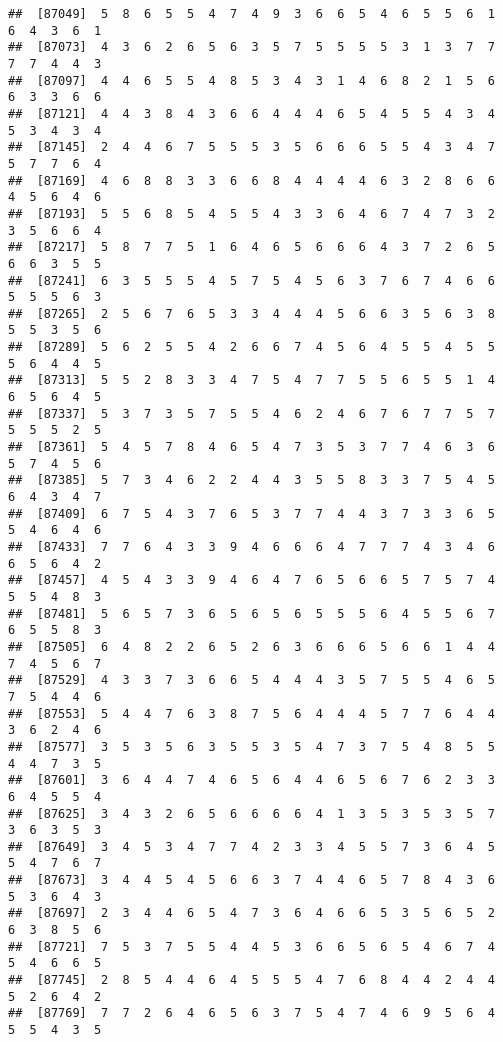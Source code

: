 \documentclass[
]{book}
\begin{document}
\begin{verbatim}
##  [87049]  5  8  6  5  5  4  7  4  9  3  6  6  5  4  6  5  5  6  1  6  4  3  6  1
##  [87073]  4  3  6  2  6  5  6  3  5  7  5  5  5  5  3  1  3  7  7  7  7  4  4  3
##  [87097]  4  4  6  5  5  4  8  5  3  4  3  1  4  6  8  2  1  5  6  6  3  3  6  6
##  [87121]  4  4  3  8  4  3  6  6  4  4  4  6  5  4  5  5  4  3  4  5  3  4  3  4
##  [87145]  2  4  4  6  7  5  5  5  3  5  6  6  6  5  5  4  3  4  7  5  7  7  6  4
##  [87169]  4  6  8  8  3  3  6  6  8  4  4  4  4  6  3  2  8  6  6  4  5  6  4  6
##  [87193]  5  5  6  8  5  4  5  5  4  3  3  6  4  6  7  4  7  3  2  3  5  6  6  4
##  [87217]  5  8  7  7  5  1  6  4  6  5  6  6  6  4  3  7  2  6  5  6  6  3  5  5
##  [87241]  6  3  5  5  5  4  5  7  5  4  5  6  3  7  6  7  4  6  6  5  5  5  6  3
##  [87265]  2  5  6  7  6  5  3  3  4  4  4  5  6  6  3  5  6  3  8  5  5  3  5  6
##  [87289]  5  6  2  5  5  4  2  6  6  7  4  5  6  4  5  5  4  5  5  5  6  4  4  5
##  [87313]  5  5  2  8  3  3  4  7  5  4  7  7  5  5  6  5  5  1  4  6  5  6  4  5
##  [87337]  5  3  7  3  5  7  5  5  4  6  2  4  6  7  6  7  7  5  7  5  5  5  2  5
##  [87361]  5  4  5  7  8  4  6  5  4  7  3  5  3  7  7  4  6  3  6  5  7  4  5  6
##  [87385]  5  7  3  4  6  2  2  4  4  3  5  5  8  3  3  7  5  4  5  6  4  3  4  7
##  [87409]  6  7  5  4  3  7  6  5  3  7  7  4  4  3  7  3  3  6  5  5  4  6  4  6
##  [87433]  7  7  6  4  3  3  9  4  6  6  6  4  7  7  7  4  3  4  6  6  5  6  4  2
##  [87457]  4  5  4  3  3  9  4  6  4  7  6  5  6  6  5  7  5  7  4  5  5  4  8  3
##  [87481]  5  6  5  7  3  6  5  6  5  6  5  5  5  6  4  5  5  6  7  6  5  5  8  3
##  [87505]  6  4  8  2  2  6  5  2  6  3  6  6  6  5  6  6  1  4  4  7  4  5  6  7
##  [87529]  4  3  3  7  3  6  6  5  4  4  4  3  5  7  5  5  4  6  5  7  5  4  4  6
##  [87553]  5  4  4  7  6  3  8  7  5  6  4  4  4  5  7  7  6  4  4  3  6  2  4  6
##  [87577]  3  5  3  5  6  3  5  5  3  5  4  7  3  7  5  4  8  5  5  4  4  7  3  5
##  [87601]  3  6  4  4  7  4  6  5  6  4  4  6  5  6  7  6  2  3  3  6  4  5  5  4
##  [87625]  3  4  3  2  6  5  6  6  6  6  4  1  3  5  3  5  3  5  7  3  6  3  5  3
##  [87649]  3  4  5  3  4  7  7  4  2  3  3  4  5  5  7  3  6  4  5  5  4  7  6  7
##  [87673]  3  4  4  5  4  5  6  6  3  7  4  4  6  5  7  8  4  3  6  5  3  6  4  3
##  [87697]  2  3  4  4  6  5  4  7  3  6  4  6  6  5  3  5  6  5  2  6  3  8  5  6
##  [87721]  7  5  3  7  5  5  4  4  5  3  6  6  5  6  5  4  6  7  4  5  4  6  6  5
##  [87745]  2  8  5  4  4  6  4  5  5  5  4  7  6  8  4  4  2  4  4  5  2  6  4  2
##  [87769]  7  7  2  6  4  6  5  6  3  7  5  4  7  4  6  9  5  6  4  5  5  4  3  5

\end{verbatim}
\end{document}
